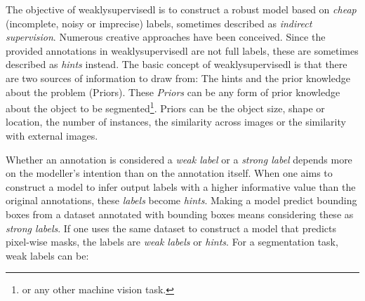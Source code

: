 \par{
    The objective of \Gls{weaklysupervisedl} is to construct a robust model based on \textit{cheap} (incomplete, noisy or imprecise) labels, sometimes described as \textit{indirect supervision}.
    Numerous creative approaches have been conceived.
    Since the provided annotations in \Gls{weaklysupervisedl} are not full labels, these are sometimes described as \textit{hints} instead\cite{ECCV2020}.
    The basic concept of \Gls{weaklysupervisedl} is that there are two sources of information to draw from: The hints and the prior knowledge about the problem (Priors).
    These \textit{Priors} can be any form of prior knowledge about the object to be segmented\footnote{or any other machine vision task.}.
    Priors can be the object size, shape or location, the number of instances, the similarity across images or the similarity with external images\cite{ECCV2020}.
}
\par{
    Whether an annotation is considered a \textit{weak label} or a \textit{strong label} depends more on the modeller's intention than on the annotation itself. 
    When one aims to construct a model to infer output labels with a higher informative value than the original annotations, these \textit{labels} become \textit{hints}.
    Making a model predict bounding boxes from a dataset annotated with bounding boxes means considering these as \textit{strong labels}. 
    If one uses the same dataset to construct a model that predicts pixel-wise masks, the labels are \textit{weak labels} or \textit{hints}.
}
For a segmentation task, weak labels can be:
